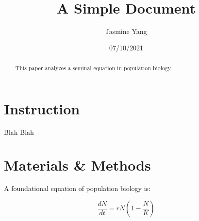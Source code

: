 \documentclass[12pt]{article}
\title{A Simple Document}
\author{Jasmine Yang}
\date{07/10/2021}
\begin{document}
    \maketitle

    \begin{abstract}
        This paper analyzes a seminal equation in population biology.
    \end{abstract}

    \section{Instruction}
        Blah Blah

    \section{Materials \& Methods}

    A foundational equation of population biology is:

    \begin{equation}
        \frac{dN}{dt} = r N (1 - \frac{N}{K})
    \end{equation}

 
\end{document}
